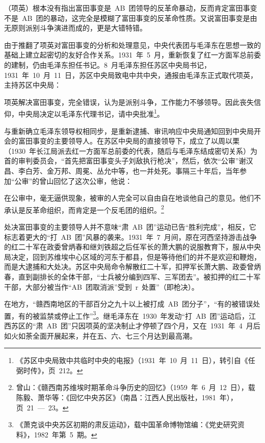 \begin{quoting}
（项英）根本没有指出富田事变是~AB~团领导的反革命暴动，反而肯定富田事变不是~AB~团的暴动，这完全是模糊了富田事变的反革命性质。又说富田事变是由无原则派别斗争演进而成的，更是大错特错。
\end{quoting}

由于推翻了项英对富田事变的分析和处理意见，中央代表团与毛泽东在思想一致的基础上建立起密切的友好合作关系。1931~年~5~月，重新恢复了红一方面军总前委的建制，仍由毛泽东担任书记。8~月毛泽东担任苏区中央局书记，1931~年~10~月~11~日，苏区中央局致电中共中央，通报由毛泽东正式取代项英，主持苏区中央局：

\begin{quoting}
项英解决富田事变，完全错误，认为是派别斗争，工作能力不够领导。因此丧失信仰，中央局决定以毛泽东代理书记，请中央批准\footnote{《苏区中央局致中共临时中央的电报》（1931~年~10~月~11~日），转引自《任弼时传》，页~212。}。
\end{quoting}

与重新确立毛泽东领导权相同步，是重新逮捕、审讯响应中央局通知回到中央局开会的富田事变的主要领导人。在苏区中央局的直接领导下，成立了以周以栗（1930~年长江局派去红一方面军总前委的代表，随后与毛泽东结成密切关系）为首的审判委员会，“首先把富田事变头子刘敌执行枪决”，然后，依次“公审”谢汉昌、李白芳、金万邦、周冕、丛允中等，也一并处死。事隔三十年后，当年参加“公审”的曾山回忆了这次公审，他说：

\begin{quoting}
在公审中，毫无逼供现象，被审的人完全可以自由自在地谈他自己的意见。他们不承认是反革命组织，而肯定是一个反毛团的组织。\footnote{曾山：《赣西南苏维埃时期革命斗争历史的回忆》（1959~年~6~月~12~日），载陈毅、萧华等：《回忆中央苏区》（南昌：江西人民出版社，1981~年），页~21~—~23。}
\end{quoting}

处决富田事变的主要领导人并不意味“肃~AB~团”运动已告“胜利完成”，相反，它标志着更大的“打~AB~团”风暴的袭来。1931~年~7~月间，原在河西坚持游击战争的红二十军在政委曾炳春和继刘铁超之后任军长的萧大鹏的说服教育下，服从中央局决定，回到苏维埃中心区域的河东于都县，但是等待他们的并不是欢迎和鞭炮，而是大逮捕和大处决。苏区中央局命令解散红二十军，扣押军长萧大鹏、政委曾炳春，直到副排长的全体干部，“士兵被分编到四军、三军团去”。被扣押的红二十军干部，大部分被当作“AB~团取消派”受到~r~处置”（即枪决）。

在地方，“赣西南地区的干部百分之九十以上被打成~AB~团分子”，“有的被错误处置，有的被监禁或停止工作”\footnote{《萧克谈中央苏区初期的肃反运动》，载中国革命博物馆编：《党史研究资料》，1982~年第~5~期。}。继毛泽东在~1930~年发动“打~AB~团”运动后，江西苏区的“肃~AB~团”只因项英的坚决制止才停顿了四个月，又在~1931~年~4~月后如火如荼全面开展起来，并在五、六、七三个月达到最高潮。

